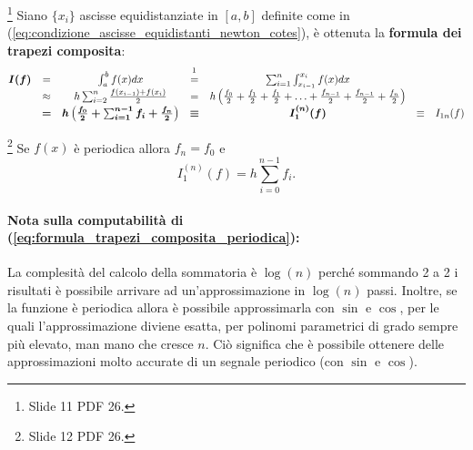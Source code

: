 
\begin{definition}\footnote{Slide 11 PDF 26.}
    Siano $\{x_i\}$ ascisse equidistanziate in $[a,b]$ definite come in (\ref{eq:condizione_ascisse_equidistanti_newton_cotes}), è ottenuta la \textbf{formula dei trapezi composita}:
    \begin{equation}\label{eq:formula_trapezi_composita}
        \begin{matrix}
            \boldsymbol{I(f)}&=&\int_a^b f(x) dx &\overset{\footnotemark}{=}&\sum_{i=1}^n\int_{x_{i-1}}^{x_i} f(x)dx\\
            &\approx& h\sum_{i=2}^n\frac{f(x_{i-1})+f(x_i)}{2} &=& h\left(\frac{f_0}{2}+\frac{f_1}{2}+\frac{f_1}{2}+\hdots +\frac{f_{n-1}}{2}+\frac{f_{n-1}}{2}+\frac{f_n}{2}\right)\\
            &\boldsymbol =&\boldsymbol{h\left(\frac{f_0}{2}+\sum_{i=1}^{n-1}f_i+\frac{f_n}{2}\right)} &\boldsymbol\equiv& \boldsymbol{I_1^{(n)}(f)} &\equiv& I_{1n}(f)
        \end{matrix}
    \end{equation}
\end{definition}


\begin{remark}
    \footnote{Slide 12 PDF 26.} Se $f(x)$ è periodica allora $f_n=f_0$ e
    \begin{equation}\label{eq:formula_trapezi_composita_periodica}
    	I_1^{(n)}(f)=h \sum_{i=0}^{n-1}f_i.
    \end{equation}
\end{remark}

\paragraph{Nota sulla computabilità di (\ref{eq:formula_trapezi_composita_periodica}):} La complesità del calcolo della sommatoria è $\log (n)$ perché sommando 2 a 2 i risultati è possibile arrivare ad un'approssimazione in $\log (n)$ passi. Inoltre, se la funzione è periodica allora è possibile approssimarla con $\sin$ e $\cos$, per le quali l'approssimazione diviene esatta, per polinomi parametrici di grado sempre più elevato, man mano che cresce $n$. Ciò significa che è possibile ottenere delle approssimazioni molto accurate di un segnale periodico (con $\sin$ e $\cos$).

